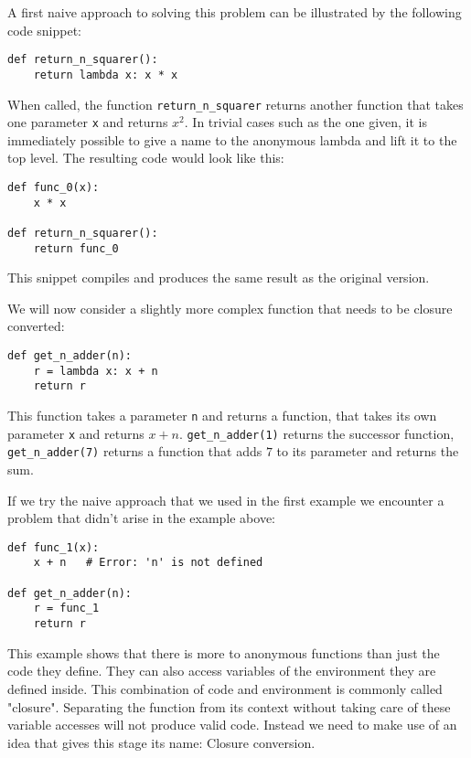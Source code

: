 \documentclass[11pt]{report}
\begin{document}
A first naive approach to solving this problem can be illustrated by the following code snippet:

\begin{lstlisting}
def return_n_squarer():
    return lambda x: x * x
\end{lstlisting}

When called, the function \texttt{return_n_squarer} returns another function that takes one parameter \texttt{x} and returns $x^2$. In trivial cases such as the one given, it is immediately possible to give a name to the anonymous lambda and lift it to the top level. The resulting code would look like this:

\begin{lstlisting}
def func_0(x):
    x * x
    
def return_n_squarer():
    return func_0
\end{lstlisting}

This snippet compiles and produces the same result as the original version.

We will now consider a slightly more complex function that needs to be closure converted:

\begin{lstlisting}
def get_n_adder(n):
    r = lambda x: x + n
    return r
\end{lstlisting}

This function takes a parameter \texttt{n} and returns a function, that takes its own parameter \texttt{x} and returns $x+n$. \texttt{get_n_adder(1)} returns the successor function, \texttt{get_n_adder(7)} returns a function that adds $7$ to its parameter and returns the sum.

If we try the naive approach that we used in the first example we encounter a problem that didn't arise in the example above:

\begin{lstlisting}
def func_1(x):
    x + n   # Error: 'n' is not defined
    
def get_n_adder(n):
    r = func_1
    return r
\end{lstlisting}

This example shows that there is more to anonymous functions than just the code they define. They can also access variables of the environment they are defined inside. This combination of code and environment is commonly called "closure". Separating the function from its context without taking care of these variable accesses will not produce valid code. Instead we need to make use of an idea that gives this stage its name: Closure conversion.
\end{document}
